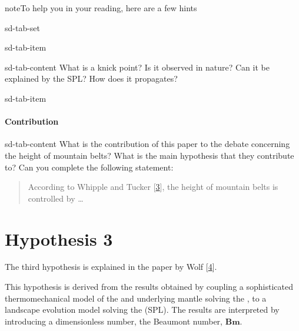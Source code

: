 \documentclass[letterpaper,10pt,english]{jupyterBook}
\let\sphinxpxdimen\pdfpxdimen\else\newdimen\sphinxpxdimen
\begin{document}
\begin{sphinxadmonition}{note}{To help you in your reading, here are a few hints}
\begin{sphinxuseclass}{sd-tab-set}
\begin{sphinxuseclass}{sd-tab-item}
\begin{sphinxuseclass}{sd-tab-content}
\sphinxAtStartPar
What is a knick point? Is it observed in nature? Can it be explained by the SPL? How does it propagates?

\end{sphinxuseclass}
\end{sphinxuseclass}
\begin{sphinxuseclass}{sd-tab-item}\subsubsection*{Contribution}

\begin{sphinxuseclass}{sd-tab-content}
\sphinxAtStartPar
What is the contribution of this paper to the debate concerning the height of mountain belts? What is the main hypothesis that they contribute to? Can you complete the following statement:
\begin{quote}

\sphinxAtStartPar
According to Whipple and Tucker {[}\hyperlink{cite.references:id3}{3}{]}, the height of mountain belts is controlled by …
\end{quote}

\end{sphinxuseclass}
\end{sphinxuseclass}
\end{sphinxuseclass}\end{sphinxadmonition}

\sphinxstepscope


\chapter{Hypothesis 3}
\label{\detokenize{hypothesis3:hypothesis-3}}\label{\detokenize{hypothesis3::doc}}
\sphinxAtStartPar
The third hypothesis is explained in the paper by Wolf  {[}\hyperlink{cite.references:id7}{4}{]}.

\begin{figure}[htbp]
\centering

\noindent\sphinxincludegraphics[height=800\sphinxpxdimen]{{wolf-etal-page}.png}
\end{figure}

\sphinxAtStartPar
This hypothesis is derived from the results obtained by coupling a sophisticated thermo\sphinxhyphen{}mechanical model of the {\hyperref[\detokenize{glossary:term-Lithosphere}]{}} and underlying mantle solving the {\hyperref[\detokenize{stokes:stokes-section}]{}}, to a landscape evolution model solving the {\hyperref[\detokenize{spl:spl-section}]{}} (SPL). The results are interpreted by introducing a dimensionless number, the Beaumont number, \(\mathbf{Bm}\).
\end{document}
